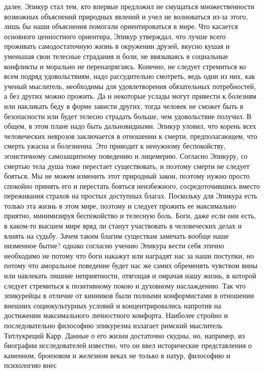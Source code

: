 далее. Эпикур стал тем, кто впервые предложил не смущаться множественности
возможных объяснений природных явлений и учел не волноваться из-за этого, лишь
бы наши объяснения помогали ориентироваться в мире. Что касается основного
ценностного ориентира, Эпикур утверждал, что лучше всего проживать
самодостаточную жизнь в окружении друзей, вкусно кушая и уменьшая свои телесные
страдания и боли, не ввязываясь в социальные конфликты и морально не
перенапрягаясь. Конечно, не следует стремиться ко всем подряд удовольствиям,
надо рассудительно смотреть, ведь одни из них, как ученый мыслитель, необходимы
для удовлетворения обязательных потребностей, а без других можно прожить. Да и
некоторые услады могут привести к болезням или накликать беду в форме зависти
других, тогда человек не сможет быть в безопасности или будет телесно страдать
больше, чем удовольствие получил. В общем, в этом плане надо быть дальновидными.
Эпикур уловил, что корень всех человеческих неврозов заключается в отношении к
смерти, предполагающем, что смерть ужасна и болезненна. Это приводит к ненужному
беспокойству, эгоистичному самозащитному поведению и лицемерию. Согласно
Эпикуру, со смертью тела душа тоже перестает существовать, и поэтому смерти не
следует бояться. Мы не можем изменить этот природный закон, поэтому нужно просто
спокойно принять его и перестать бояться неизбежного, сосредоточившись вместо
переживания страхов на простых доступных благах. Поскольку для Эпикура есть
только эта жизнь в этом мире, поэтому и следует прожить ее максимально приятно,
минимизируя беспокойство и телесную боль. Боги, даже если они есть, в каком-то
высшем мире вряд ли станут участвовать в человеческих делах и влиять на судьбу.
Зачем таким благим существам замечать вообще наше низменное бытие? однако
согласно учению Эпикура вести себя этично необходимо не потому что боги накажут
или наградят нас за наши поступки, но потому что аморальное поведение будет нас
же самих обременять чувством вины или навлекать лишние неприятности, отягощая и
омрачая нашу жизнь, в которой следует стремиться к позитивному покою и духовному
наслаждению. Так что эпикурейцы в отличие от кинников были полными конформистами
в отношении внешних социокультурных условий и концентрировались напротив на
достижении максимального личностного комфорта. Наиболее стройно и
последовательно философию эпикурезма излагает римский мыслитель Титлукреций
Карр. Данные о его жизни достаточно скудны, но, например, из биографии
исследователей известно, что он ввел исторические представления о каменном,
бронзовом и железном веках не только в натур, философию и психологию внес
